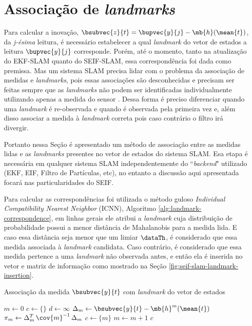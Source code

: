 \section{Associação de \textit{landmarks}}
\label{sec:data-association}
Para calcular a inovação, $\bsubvec{z}{t} = \bupvec{y}{j} - \mb{h}(\mean{t})$, da \textit{j-ésima} leitura, é necessário estabelecer a qual \textit{landmark} do vetor de estados a leitura $\bupvec{y}{j}$ 
corresponde. Porém, até o momento, tanto na atualização do EKF-SLAM quanto do SEIF-SLAM, essa correspondência foi dada como premissa. 
Mas um sistema SLAM precisa lidar com o problema da associação de medidas e \textit{landmarks}, pois essas associações são desconhecidas 
e precisam ser feitas sempre que as \textit{landmarks} não podem ser 
identificadas individualmente utilizando apenas a medida do sensor \cite[p.~4]{liu2003results}. Dessa forma é preciso diferenciar quando uma 
\textit{landmark} é re-observada e quando é observada pela primeira vez e, além disso associar a medida à \textit{landmark} correta pois caso 
contrário o filtro irá divergir.

Portanto nessa Seção é apresentado um método de associação entre as 
medidas lidas e as \textit{landmarks} presentes no vetor de estados do 
sistema SLAM. Esa etapa é necessária em qualquer sistema SLAM 
independentemente do ``\textit{backend}" utilizado (EKF, EIF, Filtro 
de Partículas, etc), no entanto a discussão aqui apresentada focará nas 
particularidades do SEIF.

Para calcular as correspondências foi utilizada o método guloso \textit{Individual Compatibility Nearest Neighbor} (ICNN), Algoritmo \ref{alg:landmark-correspondence}, em linhas gerais
ele atribui a \textit{landmark} cuja distribuição de probabilidade 
possui a menor distância de Mahalanobis \cite{mclachlan1999mahalanobis} 
para a medida lida. E caso essa distância seja menor que um limiar $\dataTh$, é considerado que essa medida associada à 
\textit{landmark} candidata. Caso contrário, é considerado que essa 
medida pertence a uma \textit{landmark} não observada antes, e então ela 
é inserida no vetor e matriz de informação como mostrado na Seção \ref{fig:seif-slam-landmark-insertion}.
\begin{algorithm}[h]
  \caption{Associação da medida $\bsubvec{y}{t}$ com \textit{landmark} do vetor de estados}
  \label{alg:landmark-correspondence}
\begin{algorithmic}[1]
  \State $m \gets 0$
  \State $c \gets \{\}$
  \State $d \gets \infty$
    \State $\Delta_m \gets \bsubvec{y}{t} - \mb{h}^{m}(\mean{t})$
    \State $\pi_m \gets \Delta_m^T \, \cov{m}^{-1} \, \Delta_m$
      \State $c \gets \{m\}$
    \EndIf
    \State $m \gets m + 1$
  \EndWhile
  \State \Return $c$
  \EndProcedure
\end{algorithmic}
\end{algorithm}

